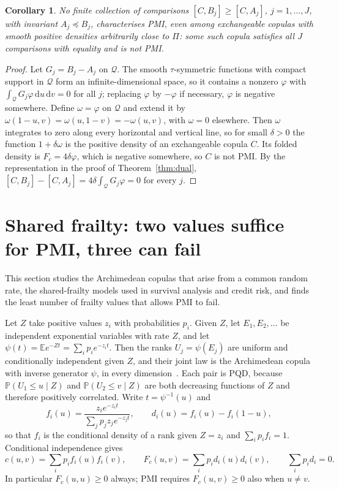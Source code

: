 \documentclass[11pt,a4paper]{article}
\newtheorem{corollary}[theorem]{Corollary}
\theoremstyle{remark}
\newcommand{\EE}{\mathbb{E}}
\newcommand{\PP}{\mathbb{P}}
\newcommand{\dd}{\,\mathrm d}
\newcommand{\Qq}{\mathcal Q}
\begin{document}
\begin{corollary}\label{cor:finite}
No finite collection of comparisons $[C,B_j]\geq[C,A_j]$, $j=1,\ldots,J$, with invariant $A_j\preceq B_j$, characterises PMI, even among exchangeable copulas with smooth positive densities arbitrarily close to $\Pi$: some such copula satisfies all $J$ comparisons with equality and is not PMI.
\end{corollary}
\begin{proof}
Let $G_j=B_j-A_j$ on $\Qq$. The smooth $\tau$-symmetric functions with compact support in $\Qq$ form an infinite-dimensional space, so it contains a nonzero $\varphi$ with $\int_{\Qq}G_j\varphi\dd u\dd v=0$ for all $j$; replacing $\varphi$ by $-\varphi$ if necessary, $\varphi$ is negative somewhere. Define $\omega=\varphi$ on $\Qq$ and extend it by $\omega(1-u,v)=\omega(u,1-v)=-\omega(u,v)$, with $\omega=0$ elsewhere. Then $\omega$ integrates to zero along every horizontal and vertical line, so for small $\delta>0$ the function $1+\delta\omega$ is the positive density of an exchangeable copula $C$. Its folded density is $F_c=4\delta\varphi$, which is negative somewhere, so $C$ is not PMI. By the representation in the proof of Theorem~\ref{thm:dual}, $[C,B_j]-[C,A_j]=4\delta\int_{\Qq}G_j\varphi=0$ for every $j$.
\end{proof}

\section{Shared frailty: two values suffice for PMI, three can fail}\label{sec:frailty}
This section studies the Archimedean copulas that arise from a common random rate, the shared-frailty models used in survival analysis and credit risk, and finds the least number of frailty values that allows PMI to fail.

Let $Z$ take positive values $z_i$ with probabilities $p_i$. Given $Z$, let $E_1,E_2,\ldots$ be independent exponential variables with rate $Z$, and let $\psi(t)=\EE e^{-Zt}=\sum_ip_ie^{-z_it}$. Then the ranks $U_j=\psi(E_j)$ are uniform and conditionally independent given $Z$, and their joint law is the Archimedean copula with inverse generator $\psi$, in every dimension~\cite{mcneil}. Each pair is PQD, because $\PP(U_1\leq u\mid Z)$ and $\PP(U_2\leq v\mid Z)$ are both decreasing functions of $Z$ and therefore positively correlated. Write $t=\psi^{-1}(u)$ and
\[
 f_i(u)=\frac{z_ie^{-z_it}}{\sum_jp_jz_je^{-z_jt}},\qquad d_i(u)=f_i(u)-f_i(1-u),
\]
so that $f_i$ is the conditional density of a rank given $Z=z_i$ and $\sum_ip_if_i=1$. Conditional independence gives
\begin{equation}
 c(u,v)=\sum_ip_if_i(u)f_i(v),\qquad F_c(u,v)=\sum_ip_id_i(u)d_i(v),\qquad\sum_ip_id_i=0 .\label{eq:gram}
\end{equation}
In particular $F_c(u,u)\geq0$ always; PMI requires $F_c(u,v)\geq0$ also when $u\neq v$.
\end{document}
